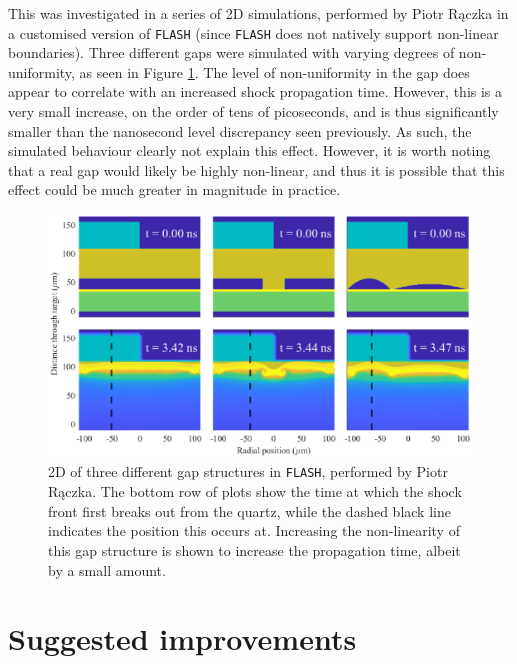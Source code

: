 This was investigated in a series of 2D simulations, performed by Piotr R\k{a}czka in a customised version of \texttt{FLASH} (since \texttt{FLASH} does not natively support non-linear boundaries). Three different gaps were simulated with varying degrees of non-uniformity, as seen in Figure \ref{fig:GapSims}. The level of non-uniformity in the gap does appear to correlate with an increased shock propagation time. However, this is a very small increase, on the order of tens of picoseconds, and is thus significantly smaller than the nanosecond level discrepancy seen previously. As such, the simulated behaviour clearly not explain this effect. However, it is worth noting that a real gap would likely be highly non-linear, and thus it is possible that this effect could be much greater in magnitude in practice.

\begin{figure} [h!]
\begin{centering}
\includegraphics[width=1\textwidth]{figures/Experiment/GapSims.eps}%
\caption{\label{fig:GapSims} 2D of three different gap structures in \texttt{FLASH}, performed by Piotr R\k{a}czka. The bottom row of plots show the time at which the shock front first breaks out from the quartz, while the dashed black line indicates the position this occurs at. Increasing the non-linearity of this gap structure is shown to increase the propagation time, albeit by a small amount.}
\end{centering}
\end{figure}

\section{Suggested improvements} \label{Suggested Improvements}

